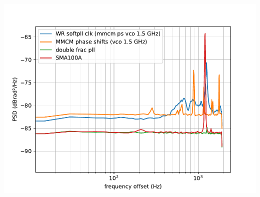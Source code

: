 \documentclass[compress,10pt,aspectratio=169]{beamer}
\begin{document}
\begin{frame}[fragile]
\begin{minipage}[t]{1.06\linewidth}
\begin{minipage}{.49\linewidth}
\includegraphics[width=1.05\linewidth]{dmtd_phase_noise_by_clk_src.pdf}
\end{minipage}
\end{minipage}
\end{frame}
\end{document}
